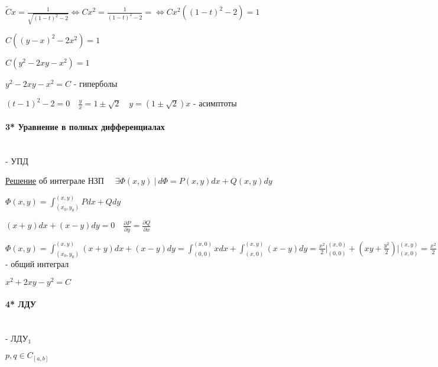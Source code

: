 \documentclass[12pt]{article}
\begin{document}
    $\tilde{C}x = \frac{1}{\sqrt{(1 - t)^2 - 2}} \Longleftrightarrow Cx^2 = \frac{1}{(1 - t)^2 - 2} = \Longleftrightarrow Cx^2 ((1 - t)^2 - 2) = 1$

    $C ((y - x)^2 - 2x^2) = 1$

    $C (y^2 - 2xy - x^2) = 1$

    $y^2 - 2xy - x^2 = C$ - гиперболы

    $(t - 1)^2 - 2 = 0 \quad \frac{y}{x} = 1 \pm \sqrt{2} \quad y = (1 \pm \sqrt{2})x$ - асимптоты

    \mediumvspace

    \hypertarget{equationincompletedifferentials}{}

    \paragraph{3* Уравнение в полных дифференциалах}\mbox{}\\

    \Def {} - УПД

    \mediumvspace

    \underline{Решение} \Mems \Ths об интеграле НЗП $\quad \exists \Phi(x, y)\ | \ d\Phi = P(x, y)dx + Q(x, y)dy$

    $\Phi(x, y) = \int^{(x,y)}_{(x_0,y_0)} Pdx + Qdy$

    \Ex $(x + y)dx + (x - y)dy = 0 \quad \frac{\partial P}{\partial y} = \frac{\partial Q}{\partial x}$

    $\Phi(x, y) = \int^{(x, y)}_{(x_0,y_0)} (x + y)dx + (x - y)dy =
    \int^{(x,0)}_{(0,0)} xdx + \int^{(x,y)}_{(x,0)} (x - y)dy = \frac{x^2}{2} \Big|_{(0, 0)}^{(x, 0)} +
    (xy + \frac{y^2}{2}) \Big|_{(x, 0)}^{(x, y)} = \frac{x^2}{2} + xy - \frac{y^2}{2} + C$ - общий интеграл

    $x^2 + 2xy - y^2 = C$

    \mediumvspace

    \hypertarget{lineardifferentialequation}{}

    \paragraph{4* ЛДУ}\mbox{}\\

    \Def {} - ЛДУ$_1$

    $p, q \in C_{[a, b]}$

    \hypertarget{methodLagrange}{}
\end{document}
